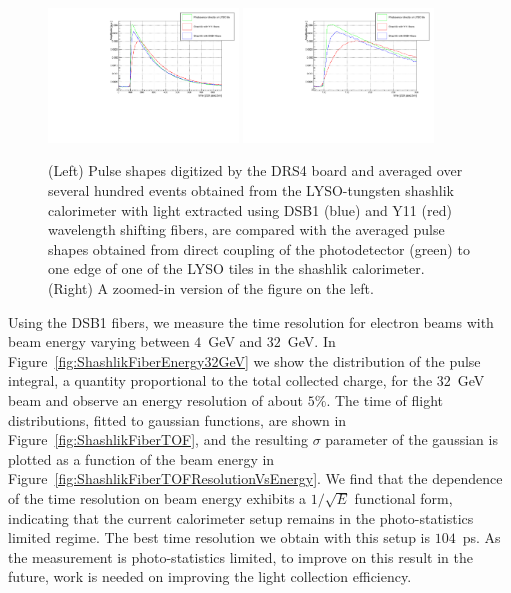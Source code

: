 \documentclass[12pt]{article}
\begin{document}
\begin{figure}[H] \centering
\includegraphics[width=0.45\textwidth]{figs/FiberPulses} 
\includegraphics[width=0.45\textwidth]{figs/FiberPulsesZoom} 
\caption{(Left) Pulse shapes digitized by the DRS4 board and averaged over several hundred events 
obtained from the LYSO-tungsten shashlik calorimeter with light extracted using
DSB1 (blue) and Y11 (red) wavelength shifting fibers, are compared with 
the averaged pulse shapes obtained from direct coupling of the photodetector (green)
to one edge of one of the LYSO tiles in the shashlik calorimeter. (Right) A zoomed-in version of the figure on the left.} 
\label{fig:FiberPulseComparison}
\end{figure}


Using the DSB1 fibers, we measure the time resolution
for electron beams with beam energy varying between $4$~GeV and $32$~GeV.
In Figure~\ref{fig:ShashlikFiberEnergy32GeV} we show the distribution
of the pulse integral, a quantity proportional to the total collected charge,
for the $32$~GeV beam and observe an energy resolution of about $5\%$.
The time of flight distributions, fitted to gaussian functions,
are shown in Figure~\ref{fig:ShashlikFiberTOF}, and the resulting
$\sigma$ parameter of the gaussian is plotted as a function of the
beam energy in Figure~\ref{fig:ShashlikFiberTOFResolutionVsEnergy}.
We find that the dependence of the time resolution on
beam energy exhibits a $1/\sqrt{E}$ functional form, indicating
that the current calorimeter setup remains in the photo-statistics
limited regime. The best time resolution we obtain
with this setup is $104$~ps. As the measurement is photo-statistics
limited, to improve on this result in the future, work is needed
on improving the light collection efficiency. 
\end{document}
